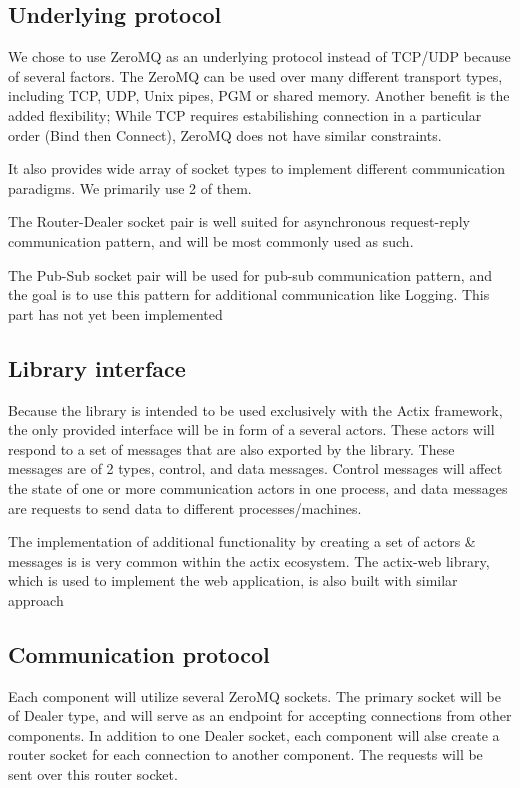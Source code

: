 \subsection{Underlying protocol}
We chose to use ZeroMQ\cite{hintjens2011} as an underlying protocol instead of TCP/UDP because of several factors. The ZeroMQ can be used over
many different transport types, including TCP, UDP, Unix pipes, PGM or shared memory. Another benefit is the added flexibility; While
TCP requires estabilishing connection in a particular order (Bind then Connect), ZeroMQ does not have similar constraints.

It also provides wide array of socket types to implement different communication paradigms. We primarily use 2 of them.

The Router-Dealer socket pair is well suited for asynchronous request-reply communication pattern, and will be most commonly used as
such.

The Pub-Sub socket pair will be used for pub-sub communication pattern, and the goal is to use this pattern for additional communication
like Logging. This part has not yet been implemented

\subsection{Library interface}
Because the library is intended to be used exclusively with the Actix framework, the only provided interface will be in form
of a several actors. These actors will respond to a set of messages that are also exported by the library. These messages
are of 2 types, control, and data messages. Control messages will affect the state of one or more communication actors
in one process, and data messages are requests to send data to different processes/machines.

The implementation of additional functionality by creating a set of actors \& messages is is very common within the actix ecosystem.
The actix-web library, which is used to implement the web application, is also built with similar approach

\subsection{Communication protocol}
Each component will utilize several ZeroMQ sockets. The primary socket will be of Dealer type, and will serve as an endpoint
for accepting connections from other components.  In addition to one Dealer socket, each component will alse create a router
socket for each connection to another component. The requests will be sent over this router socket.

